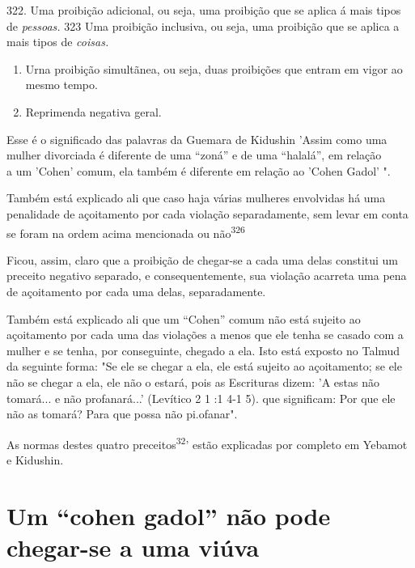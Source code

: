 322. Uma proibição adicional, ou seja, uma proibição que se aplica á
mais tipos de \emph{pessoas.} 323 Uma proibição inclusiva, ou seja, uma
proibição que se aplica a mais tipos de \emph{coisas.}


\begin{enumerate}
\def\labelenumi{\arabic{enumi}.}
\setcounter{enumi}{323}
\item
 
 Urna proibição simultãnea, ou seja, duas proibições que entram em
 vigor ao mesmo tempo.
 
\item
 
 Reprimenda negativa geral.
 
\end{enumerate}



Esse é o significado das palavras da Guemara de Kidushin 'Assim como
uma\\
mulher divorciada é diferente de uma ``zoná'' e de uma ``halalá'', em
relação\\
a um 'Cohen' comum, ela também é diferente em relação ao 'Cohen Gadol'
".

Também está explicado ali que caso haja várias mulheres envolvidas há
uma penalidade de açoitamento por cada violação separadamente, sem
le­var em conta se foram na ordem acima mencionada ou
não\textsuperscript{326}

Ficou, assim, claro que a proibição de chegar-se a cada uma delas
constitui um preceito negativo separado, e consequentemente, sua
violação acar­reta uma pena de açoitamento por cada uma delas,
separadamente.

Também está explicado ali que um ``Cohen'' comum não está sujei­to ao
açoitamento por cada uma das violações a menos que ele tenha se casado
com a mulher e se tenha, por conseguinte, chegado a ela. Isto está
exposto no Talmud da seguinte forma: "Se ele se chegar a ela, ele está
sujeito ao açoita­mento; se ele não se chegar a ela, ele não o estará,
pois as Escrituras dizem: 'A estas não tomará... e não profanará...'
(Levítico 2 1 :1 4-1 5). que significam: Por que ele não as tomará? Para
que possa não pi.ofanar".

As normas destes quatro preceitos\textsuperscript{32}' estão explicadas
por comple­to em Yebamot e Kidushin.

\section{Um ``cohen gadol'' não pode chegar-se a uma viúva}


